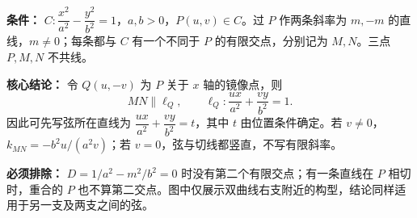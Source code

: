 \begin{statementbox}
\textbf{条件：} $C:\dfrac{x^2}{a^2}-\dfrac{y^2}{b^2}=1$，$a,b>0$，$P(u,v)\in C$。过 $P$ 作两条斜率为 $m,-m$ 的直线，$m\ne0$；每条都与 $C$ 有一个不同于 $P$ 的有限交点，分别记为 $M,N$。三点 $P,M,N$ 不共线。

\begin{center}

\end{center}

\textbf{核心结论：} 令 $Q(u,-v)$ 为 $P$ 关于 $x$ 轴的镜像点，则
\[
\boxed{MN\parallel\ell_Q},\qquad
\ell_Q:\frac{ux}{a^2}+\frac{vy}{b^2}=1.
\]
因此可先写弦所在直线为 $\boxed{\dfrac{ux}{a^2}+\dfrac{vy}{b^2}=t}$，其中 $t$ 由位置条件确定。若 $v\ne0$，$k_{MN}=-b^2u/(a^2v)$；若 $v=0$，弦与切线都竖直，不写有限斜率。

\medskip
\textbf{必须排除：} $D=1/a^2-m^2/b^2=0$ 时没有第二个有限交点；有一条直线在 $P$ 相切时，重合的 $P$ 也不算第二交点。图中仅展示双曲线右支附近的构型，结论同样适用于另一支及两支之间的弦。
\end{statementbox}
